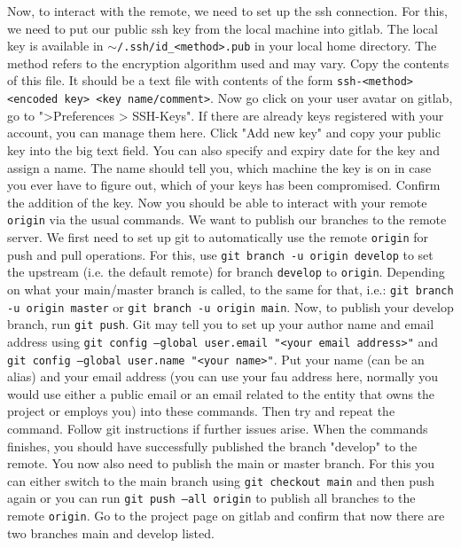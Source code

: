 \documentclass[]{erlangen-problemset}
\begin{document}
\begin{problem}[title={Dealing with remotes}]
\Question Now, to interact with the remote, we need to set up the ssh connection. For this, we need to put our public ssh key from the local machine into gitlab. 
The local key is available in \texttt{$\sim$/.ssh/id\_<method>.pub} in your local home directory. The method refers to the encryption algorithm used and may vary. 
Copy the contents of this file. It should be a text file with contents of the form \texttt{ssh-<method> <encoded key> <key name/comment>}. 
Now go click on your user avatar on gitlab, go to ">Preferences > SSH-Keys". If there are already keys registered with your account, you can manage them here.
Click "Add new key" and copy your public key into the big text field. You can also specify and expiry date for the key and assign a name. 
The name should tell you, which machine the key is on in case you ever have to figure out, which of your keys has been compromised. 
Confirm the addition of the key. 
Now you should be able to interact with your remote \texttt{origin} via the usual commands.
\Question We want to publish our branches to the remote server. We first need to set up git to automatically use the remote \texttt{origin} for push and pull operations. 
For this, use \texttt{git branch -u origin develop} to set the upstream (i.e. the default remote) for branch \texttt{develop} to \texttt{origin}.
Depending on what your main/master branch is called, to the same for that, i.e.: \texttt{git branch -u origin master} or \texttt{git branch -u origin main}.
Now, to publish your develop branch, run \texttt{git push}. 
Git may tell you to set up your author name and email address using \texttt{git config --global user.email "<your email address>"} and \texttt{git config --global user.name "<your name>"}. 
Put your name (can be an alias) and your email address (you can use your fau address here, normally you would use either a public email or an email related to the entity that owns the project or employs you) into these commands.
Then try and repeat the command. 
Follow git instructions if further issues arise. 
When the commands finishes, you should have successfully published the branch "develop" to the remote. 
You now also need to publish the main or master branch. For this you can either switch to the main branch using \texttt{git checkout main} and then push again or you can run \texttt{git push --all origin} to publish all branches to the remote \texttt{origin}.
\Question Go to the project page on gitlab and confirm that now there are two branches main and develop listed. 
\end{problem}
\end{document}
